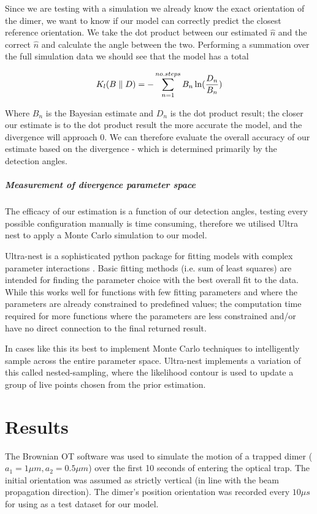 \documentclass[11pt]{article}
\begin{document}
Since we are testing with a simulation we already know the exact orientation of the dimer, we want to know if our model can correctly predict the closest reference orientation. We take the dot product between our estimated $\hat{n}$ and the correct $\hat{n}$ and calculate the angle between the two. Performing a summation over the full simulation data we should see that the model has a total  

$$ {\LARGE K_l(B \parallel D) = - \sum_{n=1}^{no. steps} B_n \ln(\frac{D_n}{B_n})}$$


Where $B_n$ is the Bayesian estimate and $D_n$ is the dot product result; the closer our estimate is to the dot product result the more accurate the model, and the divergence will approach 0. We can therefore evaluate the overall accuracy of our estimate based on the divergence - which is determined primarily by the detection angles. 

\subparagraph*{Measurement of divergence parameter space}
The efficacy of our estimation is a function of our detection angles, testing every possible configuration manually is time consuming, therefore we utilised Ultra nest to apply a Monte Carlo simulation to our model. 

Ultra-nest is a sophisticated python package for fitting models with complex parameter interactions \cite{3}. Basic fitting methods (i.e. sum of least squares) are intended for finding the parameter choice with the best overall fit to the data. While this works well for functions with few fitting parameters and where the parameters are already constrained to predefined values; the computation time required for more functions where the parameters are less constrained and/or have no direct connection to the final returned result. 

In cases like this its best to implement Monte Carlo techniques to intelligently sample across the entire parameter space. Ultra-nest implements a variation of this called nested-sampling, where the likelihood contour is used to update a group of live points chosen from the prior estimation.

\section*{Results}
The Brownian OT software was used to simulate the motion of a trapped dimer ($a_1=1\mu m, a_2=0.5\mu m$) over the first 10 seconds of entering the optical trap. The initial orientation was assumed as strictly vertical (in line with the beam propagation direction). The dimer's position orientation was recorded every $10 \mu s$ for using as a test dataset for our model. 
\end{document}
